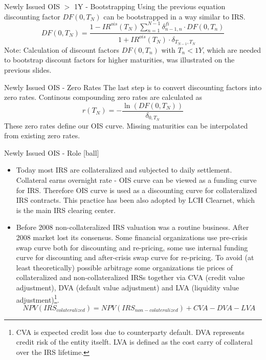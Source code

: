 \documentclass{beamer}
\begin{document}
\begin{frame}{Newly Issued OIS $>$ 1Y - Bootstrapping}
Using the previous equation discounting factor $DF(0, T_N)$ can be bootstrapped in a way similar to IRS.
\begin{equation*}
DF(0, T_N) = \frac{1 - IR^{ois}(T_N) \sum_{n = 1}^{N - 1} \delta_{n - 1, n}^{fi} \cdot DF(0, T_n)}{1 + IR^{ois}(T_N) \cdot \delta_{T_{N-1}, T_N}}
\end{equation*}
Note: Calculation of discount factors $DF(0, T_n)$ with $T_n < 1Y$, which are needed to bootstrap discount factors for higher maturities, was illustrated on the previous slides.
\end{frame}

\begin{frame}{Newly Issued OIS - Zero Rates}
The last step is to convert discounting factors into zero rates. Continous compounding zero rates are calculated as
\begin{equation*}
r(T_N) = -\frac{\ln(DF(0, T_N))}{\delta_{0, T_N}}
\end{equation*}
These zero rates define our OIS curve. Missing maturities can be interpolated from existing zero rates.
\end{frame}

\begin{frame}{Newly Issued OIS - Role}
[ball]
\begin{itemize}
\item Today most IRS are collateralized and subjected to daily settlement. Collateral earns overnight rate - OIS curve can be viewed as a funding curve for IRS. Therefore OIS curve is used as a discounting curve for collateralized IRS contracts. This practice has been also adopted by LCH Clearnet, which is the main IRS clearing center.
\item Before 2008 non-collateralized IRS valuation was a routine business. After 2008 market lost its consensus. Some financial organizations use pre-crisis swap curve both for discounting and re-pricing, some use internal funding curve for discounting and after-crisis swap curve for re-pricing. To avoid (at least theoretically) possible arbitrage some organizations tie prices of collateralized and non-collateralized IRSs together via CVA (credit value adjustment), DVA (default value adjustment) and LVA (liquidity value adjustment)\footnote{\tiny{CVA is expected credit loss due to counterparty default. DVA represents credit risk of the entity itselft. LVA is defined as the cost carry of collateral over the IRS lifetime.}}.
\begin{equation*}
NPV(IRS_{colateralized}) = NPV(IRS_{non-colateralized}) + CVA - DVA - LVA
\end{equation*}
\end{itemize}
\end{frame}
\end{document}
